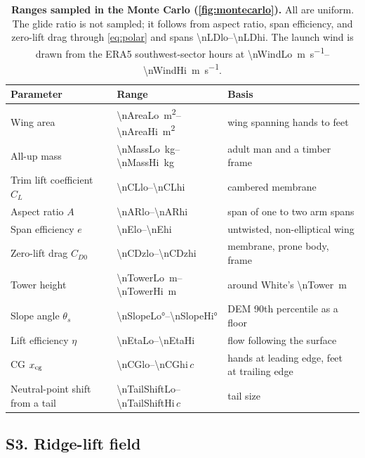 \begin{table}[ht]
  \centering
  \caption{\textbf{Ranges sampled in the Monte Carlo (\cref{fig:montecarlo}).}
  All are uniform.
  The glide ratio is not sampled; it follows from aspect ratio, span efficiency, and
  zero-lift drag through \cref{eq:polar} and spans \numrange{\nLDlo}{\nLDhi}.
  The launch wind is drawn from the ERA5 southwest-sector hours at
  \SIrange{\nWindLo}{\nWindHi}{\meter\per\second}.}
  \label{tab:priors}
  \small
  \begin{tabular}{lll}
    \toprule
    Parameter & Range & Basis \\
    \midrule
    Wing area & \SIrange{\nAreaLo}{\nAreaHi}{\meter\squared} & wing spanning hands to feet \\
    All-up mass & \SIrange{\nMassLo}{\nMassHi}{\kilogram} & adult man and a timber frame \\
    Trim lift coefficient \(C_L\) & \numrange{\nCLlo}{\nCLhi} & cambered membrane \autocite{hoerner1985lift} \\
    Aspect ratio \(A\) & \numrange{\nARlo}{\nARhi} & span of one to two arm spans \\
    Span efficiency \(e\) & \numrange{\nElo}{\nEhi} & untwisted, non-elliptical wing \autocite{drela2014flight} \\
    Zero-lift drag \(C_{D0}\) & \numrange{\nCDzlo}{\nCDzhi} & membrane, prone body, frame \autocite{hoerner1965drag,lissaman1983lowre} \\
    Tower height & \SIrange{\nTowerLo}{\nTowerHi}{\meter} & around White's \SI{\nTower}{\meter} \autocite{white1961eilmer} \\
    Slope angle \(\theta_s\) & \ang{\nSlopeLo}--\ang{\nSlopeHi} & DEM 90th percentile as a floor \\
    Lift efficiency \(\eta\) & \numrange{\nEtaLo}{\nEtaHi} & flow following the surface \\
    CG \(x_\mathrm{cg}\) & \numrange{\nCGlo}{\nCGhi}\,\(c\) & hands at leading edge, feet at trailing edge \\
    Neutral-point shift from a tail & \numrange{\nTailShiftLo}{\nTailShiftHi}\,\(c\) & tail size \\
    \bottomrule
  \end{tabular}
\end{table}

\FloatBarrier
\subsection*{S3. Ridge-lift field}


